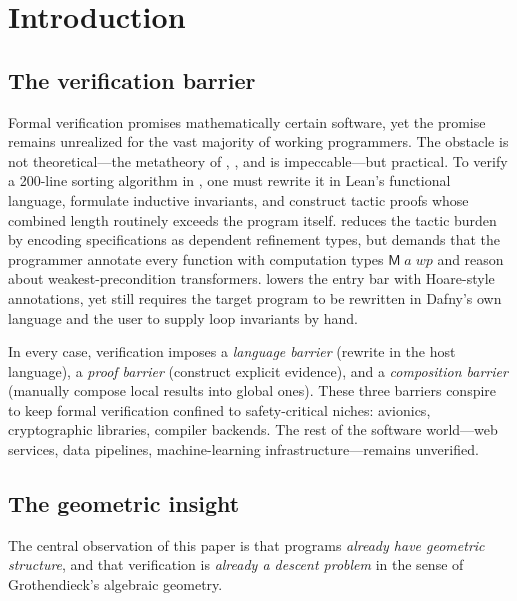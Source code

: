 \section{Introduction}\label{sec:intro}

\subsection{The verification barrier}\label{sec:intro:barrier}

Formal verification promises mathematically certain software, yet the
promise remains unrealized for the vast majority of working programmers.
The obstacle is not theoretical---the metatheory of \LEAN{}, \Coq{}, and
\Fstar{} is impeccable---but practical.  To verify a 200-line \Python{}
sorting algorithm in \LEAN{}, one must rewrite it in Lean's functional
language, formulate inductive invariants, and construct tactic proofs
whose combined length routinely exceeds the program itself.  \Fstar{}
reduces the tactic burden by encoding specifications as dependent
refinement types, but demands that the programmer annotate every function
with computation types $\mathsf{M}\;a\;\mathit{wp}$ and reason about
weakest-precondition transformers.  \Dafny{} lowers the entry bar with
Hoare-style annotations, yet still requires the target program to be
rewritten in Dafny's own language and the user to supply loop invariants
by hand.

In every case, verification imposes a \emph{language barrier} (rewrite in
the host language), a \emph{proof barrier} (construct explicit evidence),
and a \emph{composition barrier} (manually compose local results into global
ones).  These three barriers conspire to keep formal verification confined to
safety-critical niches: avionics, cryptographic libraries, compiler backends.
The rest of the software world---web services, data pipelines, machine-learning
infrastructure---remains unverified.

\subsection{The geometric insight}\label{sec:intro:insight}

The central observation of this paper is that programs \emph{already have
geometric structure}, and that verification is \emph{already a descent
problem} in the sense of Grothendieck's algebraic geometry.

